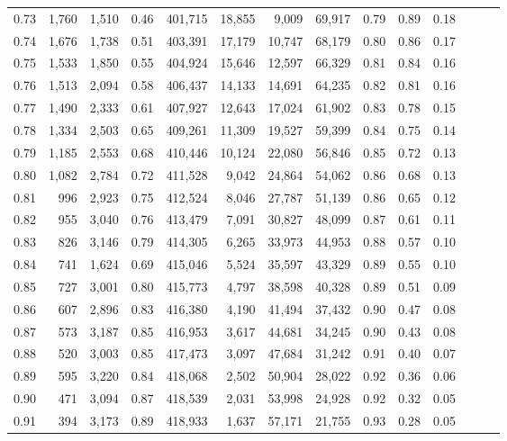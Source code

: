 \begin{tabular}{rrrrrrrrrrrrrr}
0.73 &  1,760 &  1,510 &  0.46 &  401,715 &   18,855 &   9,009 &  69,917 &  0.79 &  0.89 &      0.18 \\
0.74 &  1,676 &  1,738 &  0.51 &  403,391 &   17,179 &  10,747 &  68,179 &  0.80 &  0.86 &      0.17 \\
0.75 &  1,533 &  1,850 &  0.55 &  404,924 &   15,646 &  12,597 &  66,329 &  0.81 &  0.84 &      0.16 \\
0.76 &  1,513 &  2,094 &  0.58 &  406,437 &   14,133 &  14,691 &  64,235 &  0.82 &  0.81 &      0.16 \\
0.77 &  1,490 &  2,333 &  0.61 &  407,927 &   12,643 &  17,024 &  61,902 &  0.83 &  0.78 &      0.15 \\
0.78 &  1,334 &  2,503 &  0.65 &  409,261 &   11,309 &  19,527 &  59,399 &  0.84 &  0.75 &      0.14 \\
0.79 &  1,185 &  2,553 &  0.68 &  410,446 &   10,124 &  22,080 &  56,846 &  0.85 &  0.72 &      0.13 \\
0.80 &  1,082 &  2,784 &  0.72 &  411,528 &    9,042 &  24,864 &  54,062 &  0.86 &  0.68 &      0.13 \\
0.81 &    996 &  2,923 &  0.75 &  412,524 &    8,046 &  27,787 &  51,139 &  0.86 &  0.65 &      0.12 \\
0.82 &    955 &  3,040 &  0.76 &  413,479 &    7,091 &  30,827 &  48,099 &  0.87 &  0.61 &      0.11 \\
0.83 &    826 &  3,146 &  0.79 &  414,305 &    6,265 &  33,973 &  44,953 &  0.88 &  0.57 &      0.10 \\
0.84 &    741 &  1,624 &  0.69 &  415,046 &    5,524 &  35,597 &  43,329 &  0.89 &  0.55 &      0.10 \\
0.85 &    727 &  3,001 &  0.80 &  415,773 &    4,797 &  38,598 &  40,328 &  0.89 &  0.51 &      0.09 \\
0.86 &    607 &  2,896 &  0.83 &  416,380 &    4,190 &  41,494 &  37,432 &  0.90 &  0.47 &      0.08 \\
0.87 &    573 &  3,187 &  0.85 &  416,953 &    3,617 &  44,681 &  34,245 &  0.90 &  0.43 &      0.08 \\
0.88 &    520 &  3,003 &  0.85 &  417,473 &    3,097 &  47,684 &  31,242 &  0.91 &  0.40 &      0.07 \\
0.89 &    595 &  3,220 &  0.84 &  418,068 &    2,502 &  50,904 &  28,022 &  0.92 &  0.36 &      0.06 \\
0.90 &    471 &  3,094 &  0.87 &  418,539 &    2,031 &  53,998 &  24,928 &  0.92 &  0.32 &      0.05 \\
0.91 &    394 &  3,173 &  0.89 &  418,933 &    1,637 &  57,171 &  21,755 &  0.93 &  0.28 &      0.05 \\

\end{tabular}
